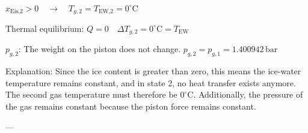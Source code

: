 \( x_{\text{Eis,2}} > 0 \quad \rightarrow \quad T_{g,2} = T_{\text{EW,2}} = 0^\circ \text{C} \)  

Thermal equilibrium: \( Q = 0 \quad \Delta T_{g,2} = 0^\circ \text{C} = T_{\text{EW}} \)  

\( p_{g,2} \): The weight on the piston does not change.  
\( p_{g,2} = p_{g,1} = 1.400942 \, \text{bar} \)  

Explanation: Since the ice content is greater than zero, this means the ice-water temperature remains constant, and in state 2, no heat transfer exists anymore. The second gas temperature must therefore be \( 0^\circ \text{C} \). Additionally, the pressure of the gas remains constant because the piston force remains constant.  

---